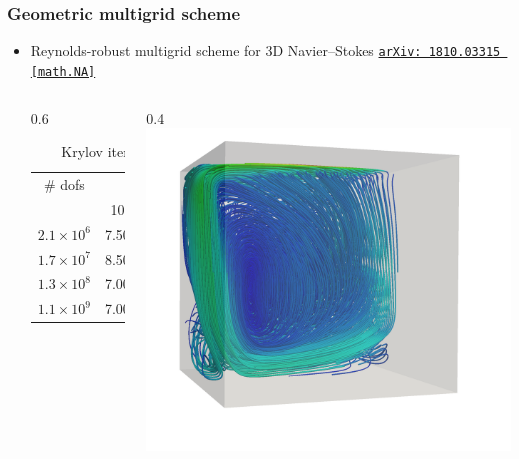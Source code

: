\documentclass[presentation, 10pt]{beamer}
\newcommand{\arxivlink}[2]{%
  \href{http://www.arxiv.org/abs/#1}%
  {\texttt{arXiv:\,#1\,[#2]}}%
}
\begin{document}
\begin{frame}
  \frametitle{Geometric multigrid scheme}
  \begin{itemize}
  \item Reynolds-robust multigrid scheme for 3D Navier--Stokes
    {\small \arxivlink{1810.03315}{math.NA}}
    \begin{columns}
      \begin{column}{0.6\pagewidth}
        {\footnotesize
          \begin{table}[htbp]
            \centering
            \begin{tabular}{c|ccccc}
              \toprule
              \# dofs & \multicolumn{5}{c}{Reynolds number} \\
                      & 10 & 100 & 1000 & 2500 & 5000 \\
              \midrule
              $2.1 \times 10^6$ & 7.50 & 7.33 & 7.50 & 7.00 & 6.50 \\
              $1.7 \times 10^7$ & 8.50 & 7.00 & 7.50 & 6.50 & 5.50 \\
              $1.3 \times 10^8$ & 7.00 & 7.00 & 6.50 & 5.00 & 6.50 \\
              $1.1 \times 10^9$ & 7.00 & 7.33 & 5.50 & 4.00 & 9.00 \\
              \bottomrule
            \end{tabular}
            \caption{Krylov iterations per Newton step}
          \end{table}
        }
      \end{column}
      \begin{column}{0.4\pagewidth}
        \includegraphics[width=1\textwidth]{LDC-streamlines}

\end{column}
\end{columns}
\end{itemize}
\end{frame}
\end{document}
